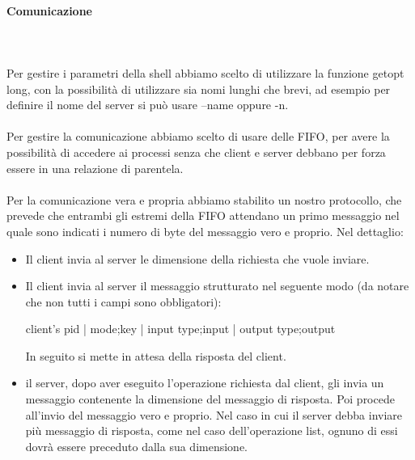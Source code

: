 \documentclass[12pt]{article}
\begin{document}
\paragraph{Comunicazione} \mbox{}\\ \\
Per gestire i parametri della shell abbiamo scelto di utilizzare la funzione getopt long, con la possibilità di utilizzare sia nomi lunghi che brevi, ad esempio per definire il nome del server si può usare --name oppure -n. \\\\
Per gestire la comunicazione abbiamo scelto di usare delle FIFO, per avere la possibilità di accedere ai processi senza che client e server debbano per forza essere in una relazione di parentela. \\\\
Per la comunicazione vera e propria abbiamo stabilito un nostro protocollo, che prevede che entrambi gli estremi della FIFO attendano un primo messaggio nel quale sono indicati i numero di byte del messaggio vero e proprio. Nel dettaglio:
	\begin{itemize}
		\item Il client invia al server le dimensione della richiesta che vuole inviare.
		\item Il client invia al server il messaggio strutturato nel seguente modo (da notare che non tutti i campi sono obbligatori):
			\begin{center}
				client's pid | mode;key | input type;input | output type;output
			\end{center}
		In seguito si mette in attesa della risposta del client.
		\item il server, dopo aver eseguito l'operazione richiesta dal client, gli invia un messaggio contenente la dimensione del messaggio di risposta. Poi procede all'invio del messaggio vero e proprio. Nel caso in cui il server debba inviare più messaggio di risposta, come nel caso dell'operazione list, ognuno di essi dovrà essere preceduto dalla sua dimensione.
	\end{itemize}
\end{document}

